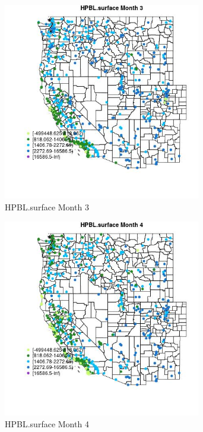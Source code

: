 \begin{figure} 
\centering  
\includegraphics[width=0.77\textwidth]{Code_Outputs/Report_ML_input_PM25_Step4_part_e_de_duplicated_aves_compiled_2019-05-14wNAs_MapObsMo3HPBLsurface.jpg} 
\caption{\label{fig:Report_ML_input_PM25_Step4_part_e_de_duplicated_aves_compiled_2019-05-14wNAsMapObsMo3HPBLsurface}HPBL.surface Month 3} 
\end{figure} 
 

\begin{figure} 
\centering  
\includegraphics[width=0.77\textwidth]{Code_Outputs/Report_ML_input_PM25_Step4_part_e_de_duplicated_aves_compiled_2019-05-14wNAs_MapObsMo4HPBLsurface.jpg} 
\caption{\label{fig:Report_ML_input_PM25_Step4_part_e_de_duplicated_aves_compiled_2019-05-14wNAsMapObsMo4HPBLsurface}HPBL.surface Month 4} 
\end{figure} 
 

